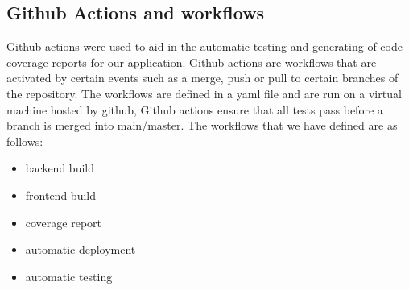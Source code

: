 \documentclass[12pt]{article}
\begin{document}
\subsection{Github Actions and workflows}
Github actions were used to aid in the automatic testing and generating of code coverage reports for our application. Github actions are workflows that are activated by certain events such as a merge, push or pull to certain branches of the repository. The workflows are defined in a yaml file and are run on a virtual machine hosted by github, Github actions ensure that all tests pass before a branch is merged into main/master. The workflows that we have defined are as follows:
\begin{itemize}
    \item backend build
    \item frontend build
    \item coverage report
    \item automatic deployment
    \item automatic testing
\end{itemize}
\end{document}
